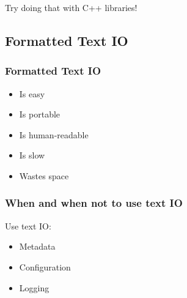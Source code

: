 \begin{Shaded}
\begin{Highlighting}[]

 
 
 
     
         
        \NormalTok{)}

    \NormalTok{)}
\end{Highlighting}
\end{Shaded}

Try doing that with C++ libraries!

\subsection{Formatted Text IO}\label{formatted-text-io}

\subsubsection{Formatted Text IO}\label{formatted-text-io-1}

\begin{itemize}
\itemsep1pt\parskip0pt
\item
  Is easy
\item
  Is portable
\item
  Is human-readable
\item
  Is slow
\item
  Wastes space
\end{itemize}

\subsubsection{When and when not to use text
IO}\label{when-and-when-not-to-use-text-io}

Use text IO:

\begin{itemize}
\itemsep1pt\parskip0pt
\item
  Metadata
\item
  Configuration
\item
  Logging
\end{itemize}

